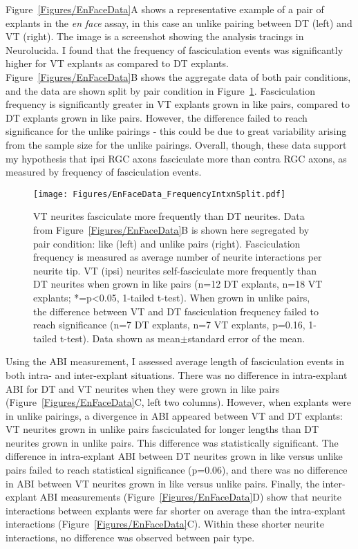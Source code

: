 Figure~\ref{Figures/EnFaceData}A shows a representative example of a pair of explants in the \emph{en face} assay, in this case an unlike pairing between DT (left) and VT (right).
The image is a screenshot showing the analysis tracings in Neurolucida.
I found that the frequency of fasciculation events was significantly higher for VT explants as compared to DT explants.
Figure~\ref{Figures/EnFaceData}B shows the aggregate data of both pair conditions, and the data are shown split by pair condition in Figure~\ref{Figures/EnFaceDataFrequencyIntxnSplit}.
Fasciculation frequency is significantly greater in VT explants grown in like pairs, compared to DT explants grown in like pairs.
However, the difference failed to reach significance for the unlike pairings - this could be due to great variability arising from the sample size for the unlike pairings.
Overall, though, these data support my hypothesis that ipsi RGC axons fasciculate more than contra RGC axons, as measured by frequency of fasciculation events.
\begin{figure}[hbtp]
    \begin{center}
        \texttt{[image: Figures/EnFaceData\_FrequencyIntxnSplit.pdf]}
        \caption[VT neurites fasciculate more frequently than DT neurites.]
        {
        VT neurites fasciculate more frequently than DT neurites.
        Data from Figure~\ref{Figures/EnFaceData}B is shown here segregated by pair condition: like (left) and unlike pairs (right).
        Fasciculation frequency is measured as average number of neurite interactions per neurite tip.
        VT (ipsi) neurites self-fasciculate more frequently than DT neurites when grown in like pairs (n=12 DT explants, n=18 VT explants; *=p<0.05, 1-tailed t-test).
        When grown in unlike pairs, the difference between VT and DT fasciculation frequency failed to reach significance (n=7 DT explants, n=7 VT explants, p=0.16, 1-tailed t-test).
        Data shown as mean$\pm$standard error of the mean.
        }
        \label{Figures/EnFaceDataFrequencyIntxnSplit}
    \end{center}
\end{figure}

Using the ABI measurement, I assessed average length of fasciculation events in both intra- and inter-explant situations.
There was no difference in intra-explant ABI for DT and VT neurites when they were grown in like pairs (Figure~\ref{Figures/EnFaceData}C, left two columns).
However, when explants were in unlike pairings, a divergence in ABI appeared between VT and DT explants: VT neurites grown in unlike pairs fasciculated for longer lengths than DT neurites grown in unlike pairs.
This difference was statistically significant.
The difference in intra-explant ABI between DT neurites grown in like versus unlike pairs failed to reach statistical significance (p=0.06), and there was no difference in ABI between VT neurites grown in like versus unlike pairs.
Finally, the inter-explant ABI measurements (Figure~\ref{Figures/EnFaceData}D) show that neurite interactions between explants were far shorter on average than the intra-explant interactions (Figure~\ref{Figures/EnFaceData}C).
Within these shorter neurite interactions, no difference was observed between pair type.

